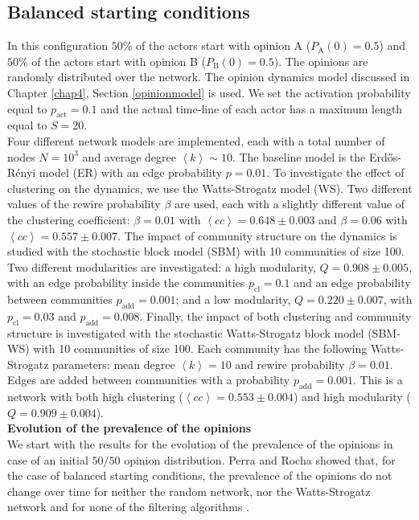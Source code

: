 \documentclass[11 pt , letterpaper , twoside , openright]{book}
\begin{document}
\subsection{Balanced starting conditions}
\label{50-50}
In this configuration $50 \%$ of the actors start with opinion A ($P_{\text{A}}(0) = 0.5$) and $50 \%$ of the actors start with opinion B ($P_{\text{B}}(0) = 0.5$). The opinions are randomly distributed over the network. The opinion dynamics model discussed in Chapter \ref{chap4}, Section \ref{opinionmodel} is used. We set the activation probability equal to $p_{\text{act}} = 0.1$ and the actual time-line of each actor has a maximum length equal to $S=20$.\\
\newline
Four different network models are implemented, each with a total number of nodes $N = 10^3$ and average degree $\left<k\right> \sim 10$. The baseline model is the Erd\H{o}s-R\'{e}nyi model (ER) with an edge probability $p = 0.01$. To investigate the effect of clustering on the dynamics, we use the Watts-Strogatz model (WS). Two different values of the rewire probability $\beta$ are used, each with a slightly different value of the clustering coefficient: $\beta = 0.01$ with $\left<cc\right> = 0.648 \pm 0.003$ and $\beta = 0.06$ with $\left<cc\right> = 0.557 \pm 0.007$. The impact of community structure on the dynamics is studied with the stochastic block model (SBM) with 10 communities of size 100. Two different modularities are investigated: a high modularity, $Q = 0.908 \pm 0.005$, with an edge probability inside the communities $p_{\text{cl}} = 0.1$ and an edge probability between communities $p_{\text{add}} = 0.001$; and a low modularity, $Q = 0.220 \pm 0.007$, with $p_{\text{cl}} = 0.03$ and $p_{\text{add}} = 0.008$. Finally, the impact of both clustering and community structure is investigated with the stochastic Watts-Strogatz block model (SBM-WS) with 10 communities of size 100. Each community has the following Watts-Strogatz parameters: mean degree $\left<k\right> =10$ and rewire probability $\beta = 0.01$. Edges are added between communities with a probability $p_{\text{add}} = 0.001$. This is a network with both high clustering ($\left<cc\right> = 0.553 \pm 0.004$) and high modularity ($Q = 0.909 \pm 0.004$).  \\
\newline
\textbf{Evolution of the prevalence of the opinions}\\
\newline
We start with the results for the evolution of the prevalence of the opinions in case of an initial $50/50$ opinion distribution. Perra and Rocha showed that, for the case of balanced starting conditions, the prevalence of the opinions do not change over time for neither the random network, nor the Watts-Strogatz network and for none of the filtering algorithms \cite{Perra2019}. 
\end{document}
